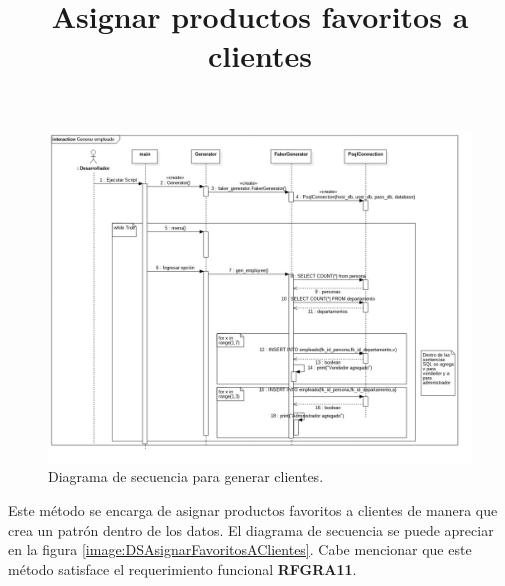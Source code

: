\FloatBarrier
\begin{figure}[htbp!]
		\centering
			\includegraphics[width=1 \textwidth]{imagenes/DSRuben/gen_employee_generator}
		\caption{Diagrama de secuencia para generar clientes.}
		\label{image:DSGenerarClientes}
\end{figure}
\FloatBarrier




\title{\textbf{Asignar productos favoritos a clientes}}
Este método se encarga de asignar productos favoritos a clientes de manera que crea un patrón dentro de los datos. El diagrama de secuencia se puede apreciar en la figura \ref{image:DSAsignarFavoritosAClientes}. Cabe mencionar que este método satisface el requerimiento funcional \textbf{RFGRA11}.

